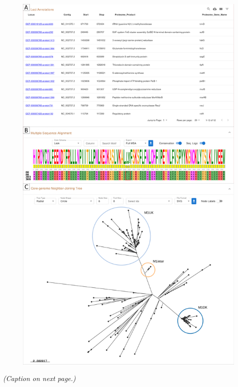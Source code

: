 \begin{figure}[!ht]
    \centering
    \includegraphics[angle=0,height=0.92\textheight]{figures/chapter 2/Figure4.pdf}
    \label{fig:chap2_figure4}
\end{figure}
\vspace*{-6mm}
\begin{center}
    \emph{(Caption on next page.)}
\end{center}

